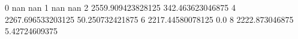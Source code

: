 0 nan nan
1 nan nan
2 2559.909423828125 342.463623046875
4 2267.696533203125 50.250732421875
6 2217.44580078125 0.0
8 2222.873046875 5.42724609375
